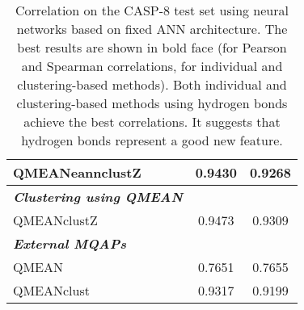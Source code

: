 \begin{table}[htbp]
\begin{tabular}{lcc}
	QMEANeannclustZ	&0.9430	&0.9268\\
	\midrule                %
	\emph{\textbf{Clustering using QMEAN}} & &\\
	QMEANclustZ	&0.9473	&0.9309\\	
	\midrule                %
	\emph{\textbf{External MQAPs}} & &\\
	QMEAN	&0.7651	&0.7655\\
	QMEANclust	&0.9317	&0.9199\\
\bottomrule                %
\end{tabular}
\caption[Performance on the CASP-8 test set using neural networks based on fixed ANN architecture]{Correlation on the CASP-8 test set using neural networks based on fixed ANN architecture. The best results are shown in bold face (for Pearson and Spearman correlations, for individual and clustering-based methods). Both individual and clustering-based methods using hydrogen bonds achieve the best correlations. It suggests that hydrogen bonds represent a good new feature.}
\label{tab:casp8}
\end{table}



